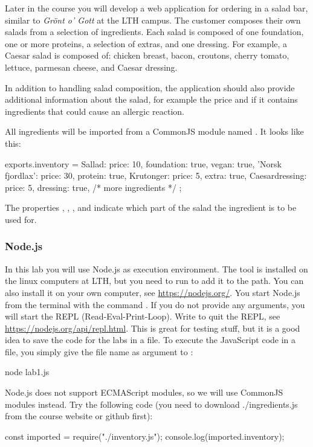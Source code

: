 \documentclass[fleqn, article, a4paper]{memoir}
\begin{document}
Later in the course you will develop a web application for ordering in a salad bar, similar to \emph{Grönt o' Gott} at the LTH campus. The customer composes their own salads from a selection of ingredients. Each salad is composed of one foundation, one or more proteins, a selection of extras, and one dressing. For example, a Caesar salad is composed of: chicken breast, bacon, croutons, cherry tomato, lettuce, parmesan cheese, and Caesar dressing.

In addition to handling salad composition, the application should also provide additional information about the salad, for example the price and if it contains ingredients that could cause an allergic reaction.

\noindent All ingredients will be imported from a CommonJS module named . It looks like this:
\begin{Code}
exports.inventory = {
  Sallad: {price: 10, foundation: true, vegan: true}, 
  'Norsk fjordlax': {price: 30, protein: true},
  Krutonger: {price: 5, extra: true},
  Caesardressing: {price: 5, dressing: true},
  /* more ingredients */
};
\end{Code}
\noindent The properties , , , and  indicate which part of the salad the ingredient is to be used for.

\subsubsection*{Node.js}

In this lab you will use Node.js as execution environment. The tool is installed on the linux computers at LTH, but you need to run  to add it to the path. You can also install it on your own computer, see \url{https://nodejs.org/}. You start Node.js from the terminal with the command . If you do not provide any arguments, you will start the REPL (Read-Eval-Print-Loop). Write  to quit the REPL, see \url{https://nodejs.org/api/repl.html}. This is great for testing stuff, but it is a good idea to save the code for the labs in a file. To execute the JavaScript code in a file, you simply give the file name as argument to :
\begin{Code}
  node lab1.js
\end{Code}
 
\noindent Node.js does not support ECMAScript modules, so we will use CommonJS modules instead. Try the following code (you need to download ./ingredients.js from the course website or github first):
\begin{Code}
  const imported = require("./inventory.js");
  console.log(imported.inventory);
\end{Code}
\end{document}
